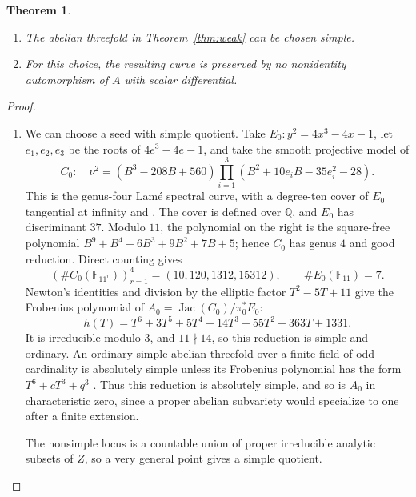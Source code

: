 \documentclass{amsart}
\newtheorem{theorem}{Theorem}
\DeclareMathOperator{\Jac}{Jac}
\begin{document}
\begin{theorem}\label{thm:strong}\
\begin{enumerate}
\item\label{thm:strong-simple} The abelian threefold in
Theorem~\ref{thm:weak} can be chosen simple.
\item\label{thm:strong-symmetries} For this choice, the resulting curve is
preserved by no nonidentity automorphism of $A$ with scalar differential.
\end{enumerate}
\end{theorem}

\begin{proof}\
\begin{enumerate}
\item We can choose a seed with simple quotient.
Take $E_0:y^2=4x^3-4x-1$, let $e_1,e_2,e_3$ be the roots of
$4e^3-4e-1$, and take the smooth projective model of
$$
C_0:\quad \nu^2=(B^3-208B+560)
\prod_{i=1}^3\left(B^2+10e_iB-35e_i^2-28\right).
$$
This is the genus-four Lam\'e spectral curve, with a degree-ten cover
of $E_0$ tangential at infinity
\cite[Table~3 and Theorem~L]{maier} and \cite[Proposition~3.1 and the discussion
after (17)]{eilbeck}.
The cover is defined over $\mathbb{Q}$, and $E_0$ has discriminant $37$.
Modulo $11$, the polynomial on the right is the square-free polynomial
$B^9+B^4+6B^3+9B^2+7B+5$; hence $C_0$ has genus $4$ and good reduction.
Direct counting gives
$$
\left(\#C_0(\mathbb{F}_{11^r})\right)_{r=1}^4
=(10,120,1312,15312),\qquad \#E_0(\mathbb{F}_{11})=7.
$$
Newton's identities and division by the elliptic factor $T^2-5T+11$
give the Frobenius polynomial of $A_0=\Jac(C_0)/\pi_0^*E_0$:
$$
h(T)=T^6+3T^5+5T^4-14T^3+55T^2+363T+1331.
$$
It is irreducible modulo $3$, and $11\nmid14$, so this reduction is
simple and ordinary. An ordinary simple abelian threefold over a
finite field of odd cardinality is absolutely simple unless its
Frobenius polynomial has the form $T^6+cT^3+q^3$
\cite[Proposition~3.4]{arias}. Thus this reduction is absolutely simple,
and so is $A_0$ in characteristic zero, since a proper abelian
subvariety would specialize to one after a finite extension.

The nonsimple locus is a countable union of proper irreducible analytic
subsets of $Z$, so a very general point gives a simple quotient.




\end{enumerate}
\end{proof}
\end{document}

